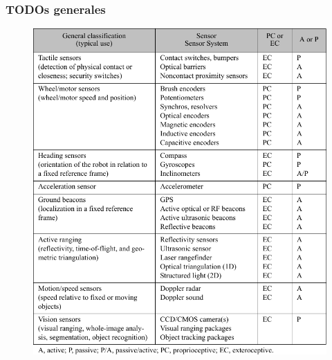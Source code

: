 \begin{frame}
    \frametitle{TODOs generales}
    
    \begin{figure}[!h]
        \centering
        \includegraphics[height=0.9\textheight]{images/sensors_table.pdf}
    \end{figure}
    
\end{frame}



